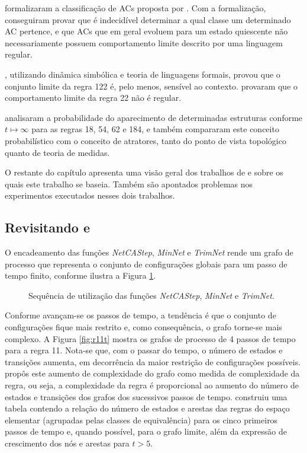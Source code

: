\documentclass[12pt,a4paper]{article}
\begin{document}
 formalizaram a classificação de ACs proposta por
. Com a formalização, conseguiram provar que é
indecidível determinar a qual classe um determinado AC pertence, e que
ACs que em geral evoluem para um estado quiescente não necessariamente possuem
comportamento limite descrito por uma linguagem regular.

, utilizando dinâmica simbólica e teoria de
linguagens formais, provou que o conjunto limite da regra 122 é,
pelo menos, sensível ao contexto.  provaram que
o comportamento limite da regra 22 não é regular.

 analisaram a probabilidade do aparecimento de
determinadas estruturas conforme $t \mapsto \infty$ para as regras
18, 54, 62 e 184, e também compararam este conceito probabilístico
com o conceito de atratores, tanto do ponto de vista topológico
quanto de teoria de medidas.

O restante do capítulo apresenta uma visão geral dos trabalhos de
 e  sobre os
quais este trabalho se baseia. Também são apontados problemas
nos experimentos executados nesses dois trabalhos.

\subsection{Revisitando  e }

O encadeamento das funções \emph{NetCAStep}, \emph{MinNet}
e \emph{TrimNet} rende um grafo de processo que representa o conjunto de
configurações globais para um passo de tempo finito, conforme ilustra
a Figura \ref{fig:net}.

\begin{figure}[htp]
\begin{center}
\begin{tikzpicture}[node distance=6cm, auto]

\end{tikzpicture}
\caption{Sequência de utilização das funções \emph{NetCAStep},
\emph{MinNet} e \emph{TrimNet}.}
\label{fig:net}
\end{center}
\end{figure}

Conforme avançam-se os passos de tempo, a tendência é que o conjunto de
configurações fique mais restrito e, como consequência, o grafo torne-se
mais complexo. A Figura \ref{fig:r11t} mostra os grafos de processo de
4 passos de tempo para a regra 11. Nota-se que, com o passar do tempo,
o número de estados e transições aumenta, em decorrência da maior
restrição de configurações possíveis.  propôs
este aumento de complexidade do grafo como medida de complexidade da
regra, ou seja, a complexidade da regra é proporcional ao aumento do número
de estados e transições dos grafos dos sucessivos passos de tempo.
 construiu uma tabela contendo a relação
do número de estados e arestas das regras do espaço elementar
(agrupadas pelas classes de equivalência) para os cinco primeiros
passos de tempo e, quando possível, para o grafo limite, além da
expressão de crescimento dos nós e arestas para $t > 5$.
\end{document}
